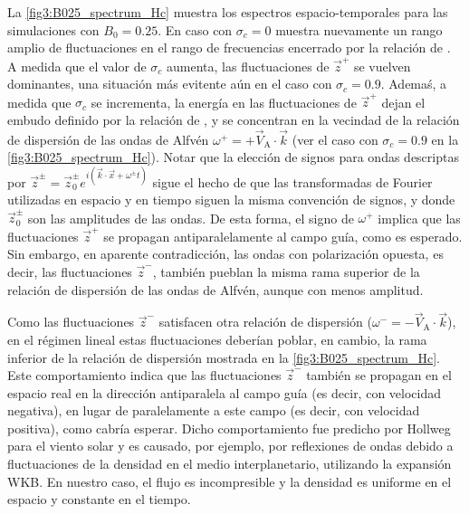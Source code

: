 La \cref{fig3:B025_spectrum_Hc} muestra los espectros
espacio-temporales para las simulaciones con $B_0=0.25$. En caso con
$\sigma_c=0$ muestra nuevamente un rango amplio de fluctuaciones en el
rango de frecuencias encerrado por la relación de \sweeping. A medida
que el valor de $\sigma_c$ aumenta, las fluctuaciones de $\vec{z}^+$
se vuelven dominantes, una situación más evitente aún en el caso con
$\sigma_c=0.9$. Ademaś, a medida que $\sigma_c$ se incrementa, la
energía en las fluctuaciones de $\vec{z}^+$ dejan el embudo definido
por la relación de \sweeping, y se concentran en la vecindad de la
relación de dispersión de las ondas de Alfvén $\omega^+ =
+\vec{V}_\textrm{A} \cdot \vec{k}$ (ver el caso con $\sigma_c=0.9$ en
la \cref{fig3:B025_spectrum_Hc}). Notar que la elección de signos para
ondas descriptas por $\vec{z}^\pm={\vec z}_0^\pm e^{i(\vec{k} \cdot
  \vec{x}+\omega^\pm t)}$ sigue el hecho de que las transformadas de
Fourier utilizadas en espacio y en tiempo siguen la misma convención
de signos, y donde ${\vec z}_0^\pm$ son las amplitudes de las ondas.
De esta forma, el signo de $\omega^+$ implica que las fluctuaciones
$\vec{z}^+$ se propagan antiparalelamente al campo guía, como es
esperado. Sin embargo, en aparente contradicción, las ondas con
polarización opuesta, es decir, las fluctuaciones $\vec{z}^-$, también
pueblan la misma rama superior de la relación de dispersión de las
ondas de Alfvén, aunque con menos amplitud.

Como las fluctuaciones $\vec{z}^-$ satisfacen otra relación de
dispersión ($\omega^- = -\vec{V}_\textrm{A} \cdot \vec{k}$), en el
régimen lineal estas fluctuaciones deberían poblar, en cambio, la rama
inferior de la relación de dispersión mostrada en la
\cref{fig3:B025_spectrum_Hc}. Este comportamiento indica que las
fluctuaciones $\vec{z}^-$ también se propagan en el espacio real en la
dirección antiparalela al campo guía (es decir, con velocidad
negativa), en lugar de paralelamente a este campo (es decir, con
velocidad positiva), como cabría esperar. Dicho comportamiento fue
predicho por Hollweg \cite{hollweg_1990_wkb} para el viento solar y es
causado, por ejemplo, por reflexiones de ondas debido a fluctuaciones
de la densidad en el medio interplanetario, utilizando la expansión
WKB. En nuestro caso, el flujo es incompresible y la densidad es
uniforme en el espacio y constante en el tiempo.

